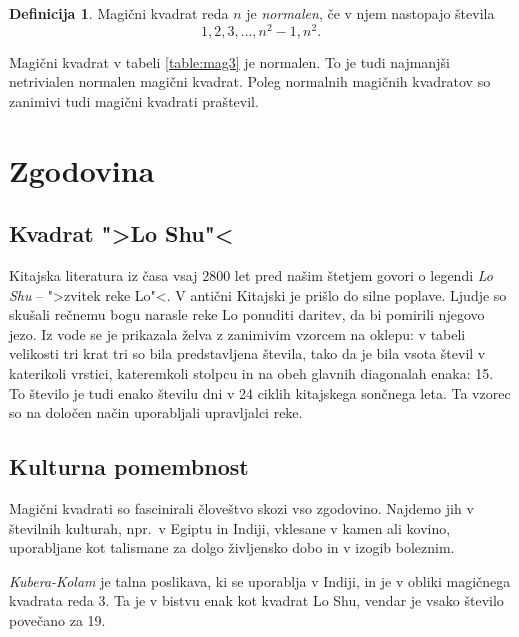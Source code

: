 \documentclass[a4paper,12pt]{article}
\theoremstyle{definition}
\newtheorem{definicija}{Definicija}
\theoremstyle{plain}
\begin{document}
\begin{definicija}
   Magični kvadrat reda \(n\) je \emph{normalen}, če v njem nastopajo števila
   \begin{equation}
      \label{eq:numbers}
      1, 2, 3, \ldots, n^2-1, n^2.
   \end{equation}
\end{definicija}

Magični kvadrat v tabeli \ref{table:mag3} je normalen.
To je tudi najmanjši netrivialen normalen magični kvadrat.
Poleg normalnih magičnih kvadratov so zanimivi tudi magični kvadrati praštevil. %


\section{Zgodovina}

\subsection{Kvadrat ">Lo Shu"<}

Kitajska literatura iz časa vsaj 2800 let pred našim štetjem govori o legendi
\emph{Lo Shu} -- ">zvitek reke Lo"<. V antični Kitajski je prišlo do
silne poplave. Ljudje so skušali rečnemu bogu narasle reke Lo ponuditi daritev,
da bi pomirili njegovo jezo. Iz vode se je prikazala želva z zanimivim vzorcem
na oklepu: v tabeli velikosti tri krat tri so bila predstavljena števila, tako
da je bila vsota števil v katerikoli vrstici, kateremkoli stolpcu in na obeh
glavnih diagonalah enaka: 15. To število je tudi enako številu dni v 24 ciklih
kitajskega sončnega leta. Ta vzorec so na določen način uporabljali upravljalci
reke.


\subsection{Kulturna pomembnost}

Magični kvadrati so fascinirali človeštvo skozi vso zgodovino. Najdemo jih
v številnih kulturah, npr.\ v Egiptu in Indiji, vklesane v kamen ali
kovino, uporabljane kot talismane za dolgo življensko dobo in v
izogib boleznim.

\emph{Kubera-Kolam} je talna poslikava, ki se uporablja v Indiji, in je v
obliki magičnega kvadrata reda 3. Ta je v bistvu enak kot kvadrat
Lo Shu, vendar je vsako število povečano za 19.
\end{document}
